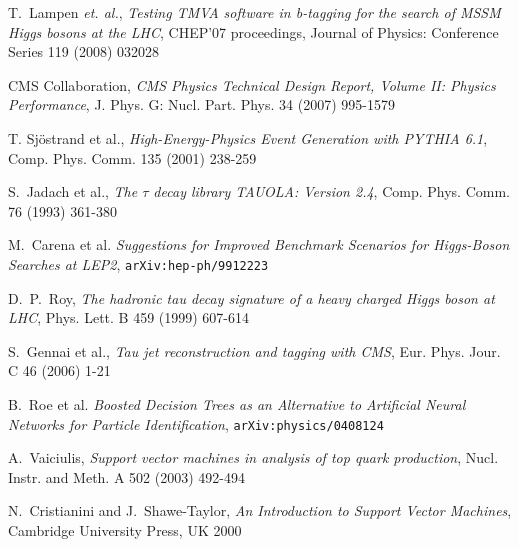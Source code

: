 \documentclass[a4paper]{jpconf}
\begin{document}
\begin{thebibliography}{9}

 T.~Lampen {\em et. al.}, \emph{Testing TMVA software in b-tagging 
                  for the search of MSSM Higgs bosons at the LHC},
CHEP’07 proceedings, Journal of Physics: Conference Series 119 (2008) 032028

 {CMS Collaboration}, \emph{{CMS} Physics Technical Design Report, Volume {II}:
             Physics Performance}, J. Phys. G: Nucl. Part. Phys. 34 (2007) 995-1579

 T. Sj\"ostrand et al., \emph{High-Energy-Physics
  Event Generation with {PYTHIA} 6.1}, Comp. Phys. Comm. 135 (2001) 238-259

 S.~Jadach et al., \emph{The $\tau$ decay library
  {TAUOLA}: Version 2.4}, Comp. Phys. Comm. 76 (1993) 361-380

 M.~Carena et al. \emph{Suggestions for Improved Benchmark Scenarios for Higgs-Boson Searches at LEP2}, 
{\tt arXiv:hep-ph/9912223} %

 D.~P.~Roy, \emph{The hadronic tau decay signature of a heavy charged Higgs
              boson at {LHC}}, Phys. Lett. B 459 (1999) 607-614

 S.~Gennai et al., \emph{Tau jet reconstruction
  and tagging with {CMS}}, Eur. Phys. Jour. C 46 (2006) 1-21

 B.~Roe et al. \emph{Boosted Decision Trees as an 
Alternative to Artificial Neural Networks for Particle Identification},
{\tt arXiv:physics/0408124}

 A.~Vaiciulis, \emph{Support vector machines in analysis of top quark production},
Nucl. Instr. and Meth. A 502 (2003) 492-494

N.~Cristianini and J.~Shawe-Taylor, \emph{An Introduction to Support Vector Machines},
Cambridge University Press, UK 2000


\end{thebibliography}
\end{document}
